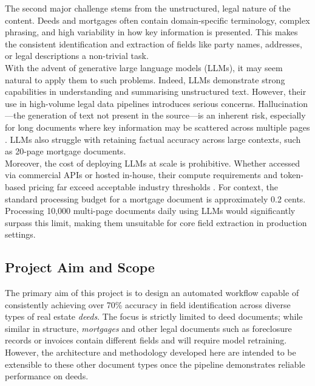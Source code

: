 \documentclass{article}
\begin{document}
The second major challenge stems from the unstructured, legal nature of the content. Deeds and mortgages often contain domain-specific terminology, complex phrasing, and high variability in how key information is presented. This makes the consistent identification and extraction of fields like party names, addresses, or legal descriptions a non-trivial task. \\

With the advent of generative large language models (LLMs), it may seem natural to apply them to such problems. Indeed, LLMs demonstrate strong capabilities in understanding and summarising unstructured text. However, their use in high-volume legal data pipelines introduces serious concerns. Hallucination—the generation of text not present in the source—is an inherent risk, especially for long documents where key information may be scattered across multiple pages \cite{ji2023survey}. LLMs also struggle with retaining factual accuracy across large contexts, such as 20-page mortgage documents. \\

Moreover, the cost of deploying LLMs at scale is prohibitive. Whether accessed via commercial APIs or hosted in-house, their compute requirements and token-based pricing far exceed acceptable industry thresholds \cite{openai2024pricing}. For context, the standard processing budget for a mortgage document is approximately 0.2 cents. \cite{bpodataentry} Processing 10,000 multi-page documents daily using LLMs would significantly surpass this limit, making them unsuitable for core field extraction in production settings. \\

\subsection{Project Aim and Scope}

The primary aim of this project is to design an automated workflow capable of consistently achieving over 70\% accuracy in field identification across diverse types of real estate \textit{deeds}. The focus is strictly limited to deed documents; while similar in structure, \textit{mortgages} and other legal documents such as foreclosure records or invoices contain different fields and will require model retraining. However, the architecture and methodology developed here are intended to be extensible to these other document types once the pipeline demonstrates reliable performance on deeds. \\
\end{document}
